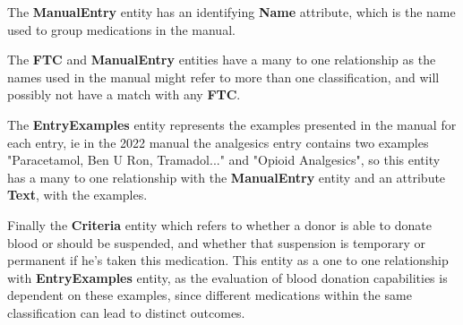 The \textbf{ManualEntry} entity has an identifying \textbf{Name} attribute, which is the name used to group medications in the manual.

The \textbf{FTC} and \textbf{ManualEntry} entities have a many to one relationship as the names used in the manual might refer to more than one classification, and will possibly not have a match with any \textbf{FTC}.

The \textbf{EntryExamples} entity represents the examples presented in the manual for each entry, ie in the 2022 manual the analgesics entry contains two examples "Paracetamol, Ben U Ron, Tramadol..." and "Opioid Analgesics", so this entity has a many to one relationship with the \textbf{ManualEntry} entity and an attribute \textbf{Text}, with the examples.

Finally the \textbf{Criteria} entity which refers to whether a donor is able to donate blood or should be suspended, and whether that suspension is temporary or permanent if he's taken this medication. This entity as a one to one relationship with \textbf{EntryExamples} entity, as the evaluation of blood donation capabilities is dependent on these examples, since different medications within the same classification can lead to distinct outcomes.















%





